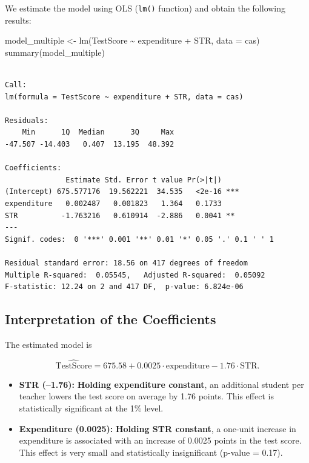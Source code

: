 \documentclass[
  12pt,
  a4paper,
]{scrbook}
\newenvironment{Shaded}{\begin{snugshade}}{\end{snugshade}}
\newcommand{\AttributeTok}[1]{\textcolor[rgb]{0.40,0.45,0.13}{#1}}
\newcommand{\FunctionTok}[1]{\textcolor[rgb]{0.28,0.35,0.67}{#1}}
\newcommand{\NormalTok}[1]{\textcolor[rgb]{0.00,0.23,0.31}{#1}}
\newcommand{\OtherTok}[1]{\textcolor[rgb]{0.00,0.23,0.31}{#1}}
\newcommand{\SpecialCharTok}[1]{\textcolor[rgb]{0.37,0.37,0.37}{#1}}
\providecommand{\tightlist}{%
  \setlength{\itemsep}{0pt}\setlength{\parskip}{0pt}}
\renewcommand{\tightlist}{\setlength{\itemsep}{0.5\baselineskip}\setlength{\parskip}{0.2\baselineskip}}
\theoremstyle{plain}
\theoremstyle{definition}
\theoremstyle{remark}
\begin{document}
We estimate the model using OLS (\texttt{lm()} function) and obtain the
following results:

\begin{Shaded}
\begin{Highlighting}[]
\NormalTok{model\_multiple }\OtherTok{\textless{}{-}} \FunctionTok{lm}\NormalTok{(TestScore }\SpecialCharTok{\textasciitilde{}}\NormalTok{ expenditure }\SpecialCharTok{+}\NormalTok{ STR, }\AttributeTok{data =}\NormalTok{ cas)}
\FunctionTok{summary}\NormalTok{(model\_multiple)}
\end{Highlighting}
\end{Shaded}

\begin{verbatim}

Call:
lm(formula = TestScore ~ expenditure + STR, data = cas)

Residuals:
    Min      1Q  Median      3Q     Max 
-47.507 -14.403   0.407  13.195  48.392 

Coefficients:
              Estimate Std. Error t value Pr(>|t|)    
(Intercept) 675.577176  19.562221  34.535   <2e-16 ***
expenditure   0.002487   0.001823   1.364   0.1733    
STR          -1.763216   0.610914  -2.886   0.0041 ** 
---
Signif. codes:  0 '***' 0.001 '**' 0.01 '*' 0.05 '.' 0.1 ' ' 1

Residual standard error: 18.56 on 417 degrees of freedom
Multiple R-squared:  0.05545,   Adjusted R-squared:  0.05092 
F-statistic: 12.24 on 2 and 417 DF,  p-value: 6.824e-06
\end{verbatim}

\subsection{Interpretation of the
Coefficients}\label{interpretation-of-the-coefficients}

The estimated model is

\[
\widehat{\text{TestScore}} = 675.58 + 0.0025 \cdot \text{expenditure} - 1.76 \cdot \text{STR}.
\]

\begin{itemize}
\tightlist
\item
  \textbf{STR (--1.76):} \textbf{Holding expenditure constant}, an
  additional student per teacher lowers the test score on average by
  1.76 points. This effect is statistically significant at the 1\%
  level.
\item
  \textbf{Expenditure (0.0025):} \textbf{Holding STR constant}, a
  one-unit increase in expenditure is associated with an increase of
  0.0025 points in the test score. This effect is very small and
  statistically insignificant (p-value = 0.17).
\end{itemize}
\end{document}
